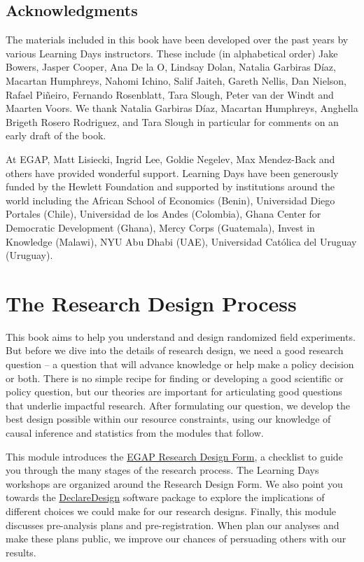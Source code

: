 \documentclass[12pt,]{book}
\begin{document}
\hypertarget{acknowledgments}{%
\section{Acknowledgments}\label{acknowledgments}}

The materials included in this book have been developed over the past years by various Learning Days instructors. These include (in alphabetical order) Jake Bowers, Jasper Cooper, Ana De la O, Lindsay Dolan, Natalia Garbiras Díaz, Macartan Humphreys, Nahomi Ichino, Salif Jaiteh, Gareth Nellis, Dan Nielson, Rafael Piñeiro, Fernando Rosenblatt, Tara Slough, Peter van der Windt and Maarten Voors. We thank Natalia Garbiras Díaz, Macartan Humphreys, Anghella Brigeth Rosero Rodriguez, and Tara Slough in particular for comments on an early draft of the book.

At EGAP, Matt Lisiecki, Ingrid Lee, Goldie Negelev, Max Mendez-Back and others have provided wonderful support. Learning Days have been generously funded by the Hewlett Foundation and supported by institutions around the world including the African School of Economics (Benin), Universidad Diego Portales (Chile), Universidad de los Andes (Colombia), Ghana Center for Democratic Development (Ghana), Mercy Corps (Guatemala), Invest in Knowledge (Malawi), NYU Abu Dhabi (UAE), Universidad Católica del Uruguay (Uruguay).

\hypertarget{the-research-design-process}{%
\chapter{The Research Design Process}\label{the-research-design-process}}

This book aims to help you understand and design randomized field experiments. But before we dive into the details of research design, we need a good research question -- a question that will advance knowledge or help make a policy decision or both. There is no simple recipe for finding or developing a good scientific or policy question, but our theories are important for articulating good questions that underlie impactful research. After formulating our question, we develop the best design possible within our resource constraints, using our knowledge of causal inference and statistics from the modules that follow.

This module introduces the \href{https://egap.github.io/learningdays-resources/Exercises/design-form.Rmd}{EGAP Research Design
Form}, a checklist to guide you through the many stages of the research process. The Learning Days workshops are organized around the Research Design Form. We also point you towards the \href{http://declaredesign.org}{DeclareDesign} software package to explore the implications of different choices we could make for our research designs. Finally, this module discusses pre-analysis plans and pre-registration. When plan our analyses and make these plans public, we improve our chances of persuading others with our results.
\end{document}
